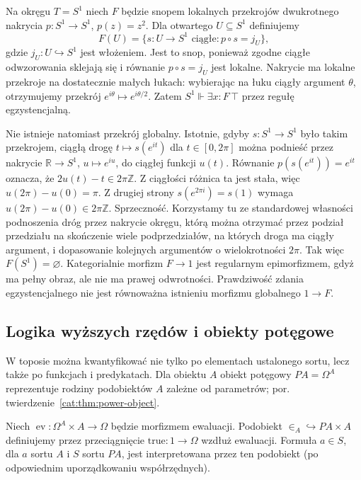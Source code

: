 \begin{przyklad}\label{cat:ex:cl-local-existence}
Na okręgu $T=S^1$ niech $F$ będzie snopem lokalnych przekrojów dwukrotnego nakrycia $p:S^1\to S^1$, $p(z)=z^2$. Dla otwartego $U\subseteq S^1$ definiujemy
\[
 F(U)=\{s:U\to S^1\text{ ciągłe}:p\circ s=j_U\},
\]
gdzie $j_U:U\hookrightarrow S^1$ jest włożeniem. Jest to snop, ponieważ zgodne ciągłe odwzorowania sklejają się i równanie $p\circ s=j_U$ jest lokalne. Nakrycie ma lokalne przekroje na dostatecznie małych łukach: wybierając na łuku ciągły argument $\theta$, otrzymujemy przekrój $e^{i\theta}\mapsto e^{i\theta/2}$. Zatem $S^1\Vdash\exists x:F\,\top$ przez regułę egzystencjalną.

Nie istnieje natomiast przekrój globalny. Istotnie, gdyby $s:S^1\to S^1$ było takim przekrojem, ciągłą drogę $t\mapsto s(e^{it})$ dla $t\in[0,2\pi]$ można podnieść przez nakrycie $\mathbb R\to S^1$, $u\mapsto e^{iu}$, do ciągłej funkcji $u(t)$. Równanie $p(s(e^{it}))=e^{it}$ oznacza, że $2u(t)-t\in2\pi\mathbb Z$. Z ciągłości różnica ta jest stała, więc $u(2\pi)-u(0)=\pi$. Z drugiej strony $s(e^{2\pi i})=s(1)$ wymaga $u(2\pi)-u(0)\in2\pi\mathbb Z$. Sprzeczność. Korzystamy tu ze standardowej własności podnoszenia dróg przez nakrycie okręgu, którą można otrzymać przez podział przedziału na skończenie wiele podprzedziałów, na których droga ma ciągły argument, i dopasowanie kolejnych argumentów o wielokrotności $2\pi$. Tak więc $F(S^1)=\varnothing$. Kategorialnie morfizm $F\to1$ jest regularnym epimorfizmem, gdyż ma pełny obraz, ale nie ma prawej odwrotności. Prawdziwość zdania egzystencjalnego nie jest równoważna istnieniu morfizmu globalnego $1\to F$.
\end{przyklad}

\subsection{Logika wyższych rzędów i obiekty potęgowe}

W toposie można kwantyfikować nie tylko po elementach ustalonego sortu, lecz także po funkcjach i predykatach. Dla obiektu $A$ obiekt potęgowy $PA=\Omega^A$ reprezentuje rodziny podobiektów $A$ zależne od parametrów; por. twierdzenie~\ref{cat:thm:power-object}.

\begin{definicja}\label{cat:def:cl-membership}
Niech $\operatorname{ev}:\Omega^A\times A\to\Omega$ będzie morfizmem ewaluacji. Podobiekt $\in_A\hookrightarrow PA\times A$ definiujemy przez przeciągnięcie $\mathrm{true}:1\to\Omega$ wzdłuż ewaluacji. Formuła $a\in S$, dla $a$ sortu $A$ i $S$ sortu $PA$, jest interpretowana przez ten podobiekt (po odpowiednim uporządkowaniu współrzędnych).
\end{definicja}

